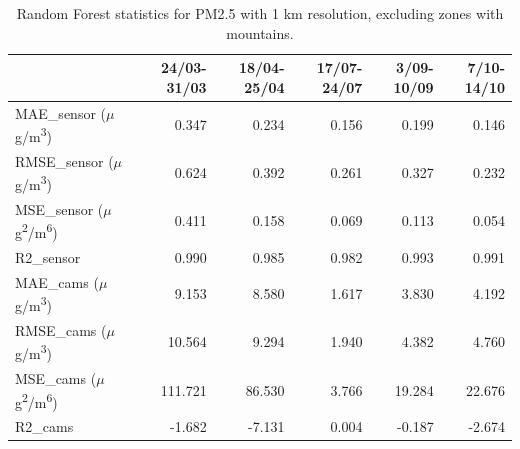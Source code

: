 \begin{table}[H]
\begin{tabular}{lrrrrr}
\toprule
 &  24/03-31/03 &  18/04-25/04 &  17/07-24/07 &  3/09-10/09 &  7/10-14/10 \\
\midrule
 MAE\_sensor ($\mu$g/m\textsuperscript{3})&        0.347 &        0.234 &        0.156 &       0.199 &       0.146 \\
RMSE\_sensor ($\mu$g/m\textsuperscript{3})&        0.624 &        0.392 &        0.261 &       0.327 &       0.232 \\
 MSE\_sensor ($\mu$g\textsuperscript{2}/m\textsuperscript{6})&        0.411 &        0.158 &        0.069 &       0.113 &       0.054 \\
  R2\_sensor &        0.990 &        0.985 &        0.982 &       0.993 &       0.991 \\
   MAE\_cams ($\mu$g/m\textsuperscript{3})&        9.153 &        8.580 &        1.617 &       3.830 &       4.192 \\
  RMSE\_cams ($\mu$g/m\textsuperscript{3})&       10.564 &        9.294 &        1.940 &       4.382 &       4.760 \\
   MSE\_cams ($\mu$g\textsuperscript{2}/m\textsuperscript{6})&      111.721 &       86.530 &        3.766 &      19.284 &      22.676 \\
    R2\_cams &       -1.682 &       -7.131 &        0.004 &      -0.187 &      -2.674 \\
\bottomrule
\end{tabular}
\caption{Random Forest statistics for PM2.5 with 1 km resolution, excluding zones with mountains.}
\end{table}
